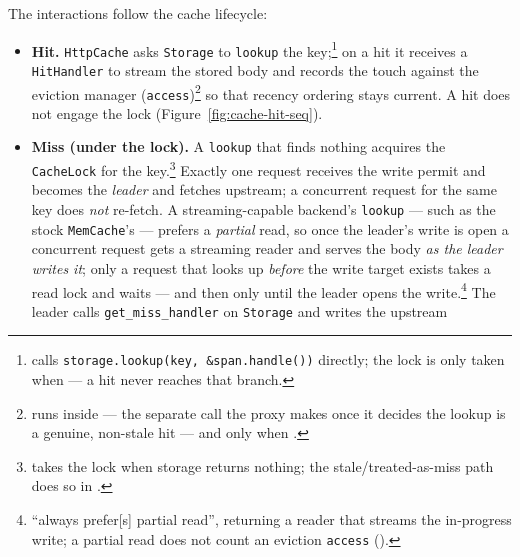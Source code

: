 The interactions follow the cache lifecycle:
\begin{itemize}
  \item \textbf{Hit.} \texttt{HttpCache} asks \texttt{Storage} to \texttt{lookup}
    the key;\footnote{
    calls \texttt{storage.lookup(key, \&span.handle())} directly; the lock is only taken
    when  ---
    a hit never reaches that branch.} on a hit it receives a \texttt{HitHandler} to stream the stored body
    and records the touch against the eviction manager
    (\texttt{access})\footnote{ runs inside
     ---
    the separate call the proxy makes once it decides the lookup is a genuine,
    non-stale hit --- and only when
    .} so that
    recency ordering stays current. A hit does not engage the lock
    (Figure~\ref{fig:cache-hit-seq}).
  \item \textbf{Miss (under the lock).} A \texttt{lookup} that finds nothing acquires
    the \texttt{CacheLock} for the
    key.\footnote{
      takes the lock when storage returns nothing; the stale/treated-as-miss path
      does so in .}
    Exactly one request receives the write permit
    and becomes the \emph{leader} and fetches upstream; a concurrent request for the
    same key does \emph{not} re-fetch. A streaming-capable backend's \texttt{lookup} ---
    such as the stock \texttt{MemCache}'s --- prefers a
    \emph{partial} read, so once the leader's write is open a concurrent request gets a
    streaming reader and serves the body \emph{as the leader writes it}; only a request
    that looks up \emph{before} the write target exists takes a read lock and waits ---
    and then only until the leader opens the
    write.\footnote{
      ``always prefer[s] partial read'', returning a reader that streams the in-progress
      write; a partial read does not count an eviction \texttt{access}
      ().} The
    leader calls \texttt{get\_miss\_handler} on \texttt{Storage} and writes the upstream

\end{itemize}
